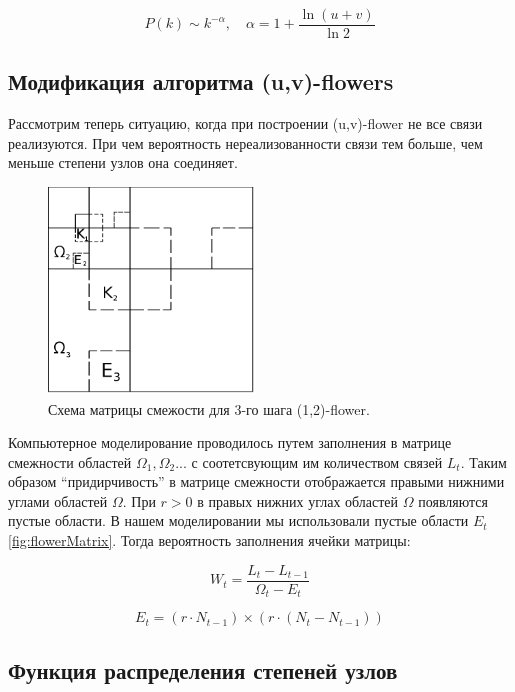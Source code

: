 \documentclass[10pt,aps,pra]{revtex4-1}
\begin{document}
\begin{equation}
P(k) \sim k^{-\alpha}, \quad \alpha = 1+\frac{\ln{(u+v)}}{\ln{2}}
\end{equation}

\subsection{Модификация алгоритма (u,v)-flowers}

Рассмотрим теперь ситуацию, когда при построении (u,v)-flower не все связи реализуются. При чем вероятность нереализованности связи тем больше, чем меньше степени узлов она соединяет.

\begin{figure}[H]

\centering
\includegraphics[height=5.5cm]{graphics/third_n.png}
\caption{
\label{fig:flowerMatrixExceptive}
Схема матрицы смежости для 3-го шага (1,2)-flower.}
\end{figure}

Компьютерное моделирование проводилось путем заполнения в матрице смежности областей $\Omega_1, \Omega_2...$ с соотетсвующим им количеством связей $L_t$. Таким образом ``придирчивость'' в матрице смежности отображается правыми нижними углами областей $\Omega$. При $r>0$ в правых нижних углах областей $\Omega$ появляются пустые области. В нашем моделировании мы использовали пустые области $E_t$ \ref{fig:flowerMatrix}. Тогда вероятность заполнения ячейки матрицы:

\begin{equation}
W_t=\frac{L_t-L_{t-1}}{\Omega_t-E_t}
\end{equation}

\begin{equation}
E_t= (r \cdot N_{t-1}) \times (r \cdot (N_t - N_{t-1}))
\end{equation}

\subsection{Функция распределения степеней узлов}
\end{document}
